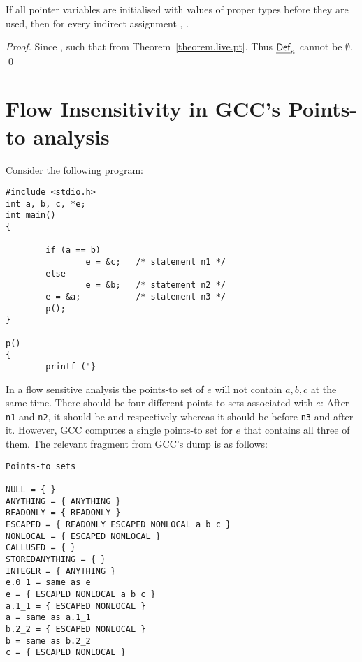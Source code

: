 \documentclass{llncs}
\newcommand{\pt}[2]{\text{$(#1,#2)$}}
\newcommand{\ain}{\text{{\sf\em Ain\/}}\xspace}
\newcommand{\Def}{\text{{\sf\em Def}}\xspace}
\newcommand{\Ref}{\text{{\sf\em Ref}}\xspace} \newcommand{\sRef}{\text{{\sf\em sRef}}\xspace}
\begin{document}
\begin{corollary}
\label{cor.def.not.empty}
If all pointer variables are initialised with values of proper types
before they are used, then for every indirect assignment ,
\text{$\Def_n \neq \emptyset$}.
\end{corollary}
\begin{proof}
Since \text{$x\in\Ref_n$}, \text{$\exists\pt{x}{z} \in \ain_n$} such that 
from Theorem~\ref{theorem.live.pt}. Thus $\Def_n$ cannot be $\emptyset$.
\qed
\end{proof}

\section{Flow Insensitivity in GCC's Points-to analysis}
\label{app:pt.counter.examples} 

Consider the following program:
\begin{verbatim}
#include <stdio.h>
int a, b, c, *e;
int main()
{

        if (a == b)
                e = &c;   /* statement n1 */
        else
                e = &b;   /* statement n2 */
        e = &a;           /* statement n3 */
        p();
}

p()
{
        printf ("}
\end{verbatim}

In a flow sensitive analysis the points-to set of $e$ will not contain $a, b, c$ at the same time. 
There should be four different points-to sets associated with $e$: After {\tt n1} and {\tt n2},
it should be  and  respectively whereas it should be 
before {\tt n3} and  after it.  However,
GCC computes a single points-to set for $e$ that contains all three of them.
The relevant fragment from GCC's dump is as follows:
\begin{verbatim}
Points-to sets

NULL = { }
ANYTHING = { ANYTHING }
READONLY = { READONLY }
ESCAPED = { READONLY ESCAPED NONLOCAL a b c }
NONLOCAL = { ESCAPED NONLOCAL }
CALLUSED = { }
STOREDANYTHING = { }
INTEGER = { ANYTHING }
e.0_1 = same as e
e = { ESCAPED NONLOCAL a b c }
a.1_1 = { ESCAPED NONLOCAL }
a = same as a.1_1
b.2_2 = { ESCAPED NONLOCAL }
b = same as b.2_2
c = { ESCAPED NONLOCAL }
\end{verbatim}
\end{document}

